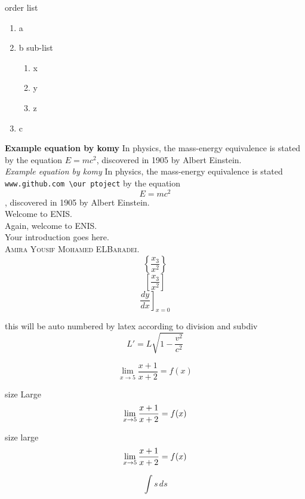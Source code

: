   
  order list
  \begin{enumerate}
      \item a
      \item b
       sub-list
            \begin{enumerate}
              \item x
              \item y
              \item z
            \end{enumerate}
      \item c
  \end{enumerate}
  
  

\textbf{Example equation by komy} In physics, the mass-energy equivalence is stated 
by the equation $E=mc^2$, discovered in 1905 by Albert Einstein.\\
\textit{Example equation by komy} In physics, the mass-energy equivalence is stated 
\texttt{www.github.com \textbackslash our ptoject}
by the equation $$E=mc^2$$, discovered in 1905 by Albert Einstein.\\
Welcome to \Ac{ENIS}.~\\
Again, welcome to \Ac{ENIS}. ~\\
Your introduction goes here. ~\\

\textsc{Amira Yousif Mohamed ELBaradei}.\\

$$\left\{\frac{x_3}{x^2}\right\}$$
$$\left[\frac{x_3}{x^2}\right]$$
$$\left.\frac{d y}{d x}\right]_{x=0}$$

this will be auto numbered by latex according to division and subdiv
\begin{equation}
L' = {L}{\sqrt{1-\frac{v^2}{c^2}}}
\end{equation}

\begin{equation}
\lim \limits_{x \to 5} \frac{x+1}{x+2}  = f(x)
\end{equation}

size Large
\begin{equation}
\Large \lim \limits_{x \to 5} \frac{x+1}{x+2}  = f(x)
\end{equation}

size large
\begin{equation}
\large \lim \limits_{x \to 5} \frac{x+1}{x+2}  = f(x)
\end{equation}

\begin{equation}
\displaystyle{\int s \, ds}
\end{equation}

